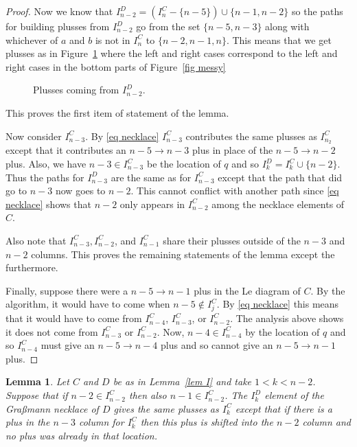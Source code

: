 \documentclass[11pt]{article}
\newtheorem{lem}[thm]{Lemma}
\theoremstyle{remark}
\theoremstyle{definition}
\begin{document}
\begin{proof}
  Now we know that $I_{n-2}^{D}  = (I_{n}^{C} - \{n-5\})\cup \{n-1,n-2\}$ so the paths for building plusses from $I_{n-2}^{D}$ go from the set $\{n-5, n-3\}$ along with whichever of $a$ and $b$ is not in $I_{n}^{C}$ to $\{n-2, n-1, n\}$.  This means that we get plusses as in Figure~\ref{fig messyD} where the left and right cases correspond to the left and right cases in the bottom parts of Figure~\ref{fig messy}

  \begin{figure}
    \caption{Plusses coming from $I_{n-2}^{D}$.}\label{fig messyD}
  \end{figure}

  This proves the first item of statement of the lemma.

  Now consider $I_{n-3}^{C}$.  By \eqref{eq necklace} $I_{n-3}^{C}$ contributes the same plusses as $I_{n_2}^{C}$ except that it contributes an $n-5\rightarrow n-3$ plus in place of the $n-5\rightarrow n-2$ plus.  Also, we have $n-3\in I_{n-3}^{C}$ be the location of $q$ and so $I_{k}^{D} = I_k^{C}\cup\{n-2\}$.  Thus the paths for $I^{D}_{n-3}$ are the same as for $I^{C}_{n-3}$ except that the path that did go to $n-3$ now goes to $n-2$.  This cannot conflict with another path since \eqref{eq necklace} shows that $n-2$ only appears in $I_{n-2}^{C}$ among the necklace elements of $C$.

  Also note that $I_{n-3}^{C}, I_{n-2}^{C}$, and $I_{n-1}^{C}$ share their plusses outside of the $n-3$ and $n-2$ columns.  This proves the remaining statements of the lemma except the furthermore.

  Finally, suppose there were a $n-5\rightarrow n-1$ plus in the Le diagram of $C$.  By the algorithm, it would have to come when $n-5 \not\in I_j^{C}$.  By \eqref{eq necklace} this means that it would have to come from $I_{n-4}^{C}$, $I_{n-3}^{C}$, or $I_{n-2}^{C}$. The analysis above shows it does not come from $I_{n-3}^{C}$ or $I_{n-2}^{C}$.   Now, $n-4\in I_{n-4}^{C}$ by the location of $q$ and so $I_{n-4}^{C}$ must give an $n-5\rightarrow n-4$ plus and so cannot give an $n-5\rightarrow n-1$ plus.

\end{proof}


\begin{lem}\label{lem other k}
  Let $C$ and $D$ be as in Lemma~\ref{lem I} and take $1<k<n-2$.  Suppose that if $n-2\in I_{n-2}^{C}$ then also $n-1\in I_{n-2}^{C}$.
  The $I_k^{D}$ element of the Gra\ss mann necklace of $D$ gives the same plusses as $I_{k}^{C}$ except that if there is a plus in the $n-3$ column for $I_{k}^{C}$ then this plus is shifted into the $n-2$ column and no plus was already in that location.
\end{lem}
\end{document}
